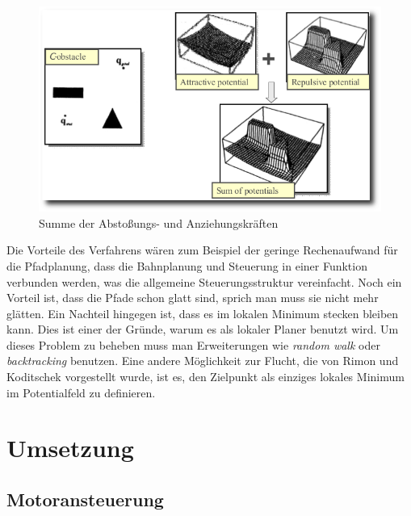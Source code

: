 \begin{figure}[h]
\center
\includegraphics[scale=0.4]{graphics/potentialfeld.png}
\caption{\label{fig:potentialfeld} Summe der Abstoßungs- und Anziehungskräften \citep{innoKonz}}
\end{figure}

Die Vorteile des Verfahrens wären zum Beispiel der geringe Rechenaufwand für die Pfadplanung, dass die Bahnplanung und Steuerung in einer Funktion verbunden werden\citep{mobileRobotics}, was die allgemeine Steuerungsstruktur vereinfacht.
Noch ein Vorteil ist, dass die Pfade schon glatt sind, sprich man muss sie nicht mehr glätten.
Ein Nachteil hingegen ist, dass es im lokalen Minimum stecken bleiben kann.
Dies ist einer der Gründe, warum es als lokaler Planer benutzt wird.
Um dieses Problem zu beheben muss man Erweiterungen wie  \textit{random walk} oder \textit{backtracking} benutzen.
Eine andere Möglichkeit zur Flucht, die von Rimon und Koditschek vorgestellt wurde, ist es, den Zielpunkt als einziges lokales Minimum im Potentialfeld zu definieren.




\section{Umsetzung}
\label{bahnplanung_umsetzung_sec}


\subsection{Motoransteuerung}
\label{bahnplanung_motoansteuerung_subsec}
\authorsection{\editoroier}



